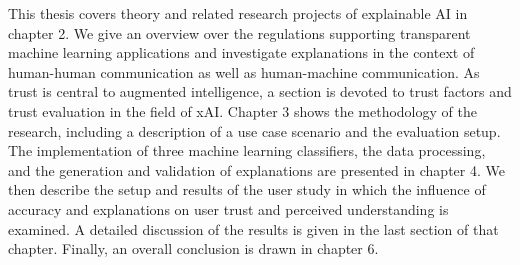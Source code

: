 This thesis covers theory and related research projects of explainable AI in chapter 2. We give an overview over the regulations supporting transparent machine learning applications and investigate explanations in the context of human-human communication as well as human-machine communication. As trust is central to augmented intelligence, a section is devoted to trust factors and trust evaluation in the field of xAI. Chapter 3 shows the methodology of the research, including a description of a use case scenario and the evaluation setup. The implementation of three machine learning classifiers, the data processing, and the generation and validation of explanations are presented in chapter 4. We then describe the setup and results of the user study in which the influence of accuracy and explanations on user trust and perceived understanding is examined. A detailed discussion of the results is given in the last section of that chapter. Finally, an overall conclusion is drawn in chapter 6. 


